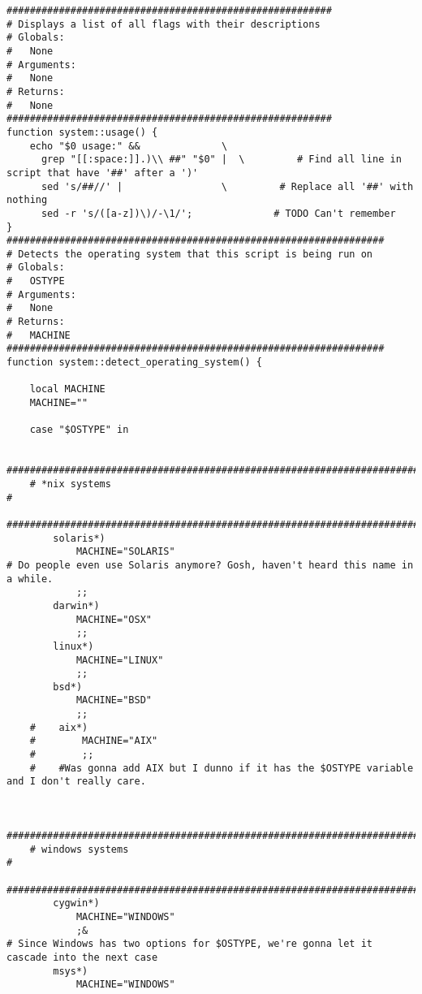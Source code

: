 \documentclass[11pt]{article}
\begin{document}
\begin{verbatim}
########################################################
# Displays a list of all flags with their descriptions
# Globals:
#   None
# Arguments:
#   None
# Returns:
#   None
########################################################
function system::usage() {
    echo "$0 usage:" &&              \
      grep "[[:space:]].)\\ ##" "$0" |  \         # Find all line in script that have '##' after a ')'
      sed 's/##//' |                 \         # Replace all '##' with nothing
      sed -r 's/([a-z])\)/-\1/';              # TODO Can't remember
}
#################################################################
# Detects the operating system that this script is being run on
# Globals:
#   OSTYPE
# Arguments:
#   None
# Returns:
#   MACHINE
#################################################################
function system::detect_operating_system() {

    local MACHINE
    MACHINE=""

    case "$OSTYPE" in

    #########################################################################
    # *nix systems                                                          #
    #########################################################################
        solaris*)
            MACHINE="SOLARIS"                                                     # Do people even use Solaris anymore? Gosh, haven't heard this name in a while.
            ;;
        darwin*)
            MACHINE="OSX"
            ;;
        linux*)
            MACHINE="LINUX"
            ;;
        bsd*)
            MACHINE="BSD"
            ;;
    #    aix*)
    #        MACHINE="AIX"
    #        ;;
    #    #Was gonna add AIX but I dunno if it has the $OSTYPE variable and I don't really care.


    #########################################################################
    # windows systems                                                       #
    #########################################################################
        cygwin*)
            MACHINE="WINDOWS"
            ;&                                                                    # Since Windows has two options for $OSTYPE, we're gonna let it cascade into the next case
        msys*)
            MACHINE="WINDOWS"


\end{verbatim}
\end{document}
